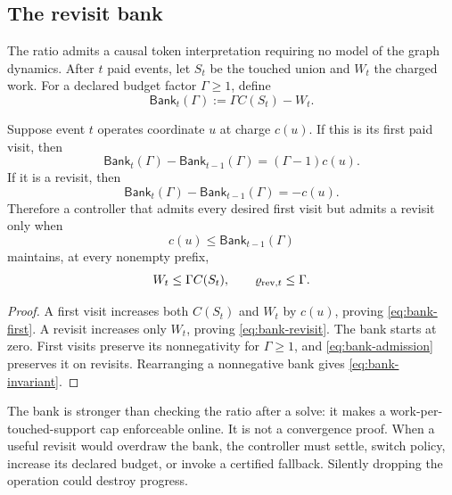 \subsection{The revisit bank}

The ratio admits a causal token interpretation requiring no model of the
graph dynamics.  After $t$ paid events, let $S_t$ be the touched union and
$W_t$ the charged work.  For a declared budget factor $\Gamma\geq1$, define
\begin{equation}
 \mathsf{Bank}_t(\Gamma):=\Gamma C(S_t)-W_t.
 \label{eq:revisit-bank}
\end{equation}

\begin{theorem}
\label{thm:revisit-bank}
Suppose event $t$ operates coordinate $u$ at charge $c(u)$.  If this is its
first paid visit, then
\begin{equation}
 \mathsf{Bank}_t(\Gamma)-\mathsf{Bank}_{t-1}(\Gamma)
 =(\Gamma-1)c(u).
 \label{eq:bank-first}
\end{equation}
If it is a revisit, then
\begin{equation}
 \mathsf{Bank}_t(\Gamma)-\mathsf{Bank}_{t-1}(\Gamma)
 =-c(u).
 \label{eq:bank-revisit}
\end{equation}
Therefore a controller that admits every desired first visit but admits a
revisit only when
\begin{equation}
 c(u)\leq\mathsf{Bank}_{t-1}(\Gamma)
 \label{eq:bank-admission}
\end{equation}
maintains, at every nonempty prefix,
\begin{equation}
 W_t\leq\Gamma C(S_t),
 \qquad
 \varrho_{{\rm rev},t}\leq\Gamma.
 \label{eq:bank-invariant}
\end{equation}
\end{theorem}

\begin{proof}
A first visit increases both $C(S_t)$ and $W_t$ by $c(u)$, proving
\cref{eq:bank-first}.  A revisit increases only $W_t$, proving
\cref{eq:bank-revisit}.  The bank starts at zero.  First visits preserve its
nonnegativity for $\Gamma\geq1$, and
\cref{eq:bank-admission} preserves it on revisits.  Rearranging a nonnegative
bank gives \cref{eq:bank-invariant}.
\end{proof}

The bank is stronger than checking the ratio after a solve: it makes a
work-per-touched-support cap enforceable online.  It is not a convergence
proof.  When a useful revisit would overdraw the bank, the controller must
settle, switch policy, increase its declared budget, or invoke a certified
fallback.  Silently dropping the operation could destroy progress.

